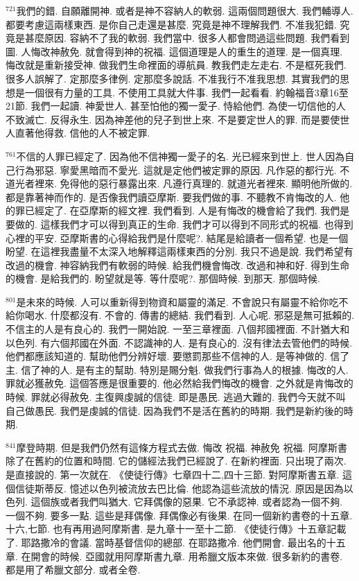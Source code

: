\documentclass{book}
\begin{document}
$^{721}$我們的錯.
自願離開神.
或者是神不容納人的軟弱.
這兩個問題很大.
我們輔導人.
都要考慮這兩樣東西.
是你自己走還是甚麼.
究竟是神不理解我們.
不准我犯錯.
究竟是甚麼原因.
容納不了我的軟弱.
我們當中.
很多人都會問過這些問題.
我們看到圖.
人悔改神赦免.
就會得到神的祝福.
這個道理是人的重生的道理.
是一個真理.
悔改就是重新接受神.
做我們生命裡面的導航員.
教我們走左走右.
不是框死我們.
很多人誤解了.
定那麼多律例.
定那麼多說話.
不准我行不准我思想.
其實我們的思想是一個很有力量的工具.
不使用工具就大件事.
我們一起看看.
約翰福音3章16至21節.
我們一起讀.
神愛世人.
甚至怕他的獨一愛子.
恃給他們.
為使一切信他的人不致滅亡.
反得永生.
因為神差他的兒子到世上來.
不是要定世人的罪.
而是要使世人直著他得救.
信他的人不被定罪.

$^{761}$不信的人罪已經定了.
因為他不信神獨一愛子的名.
光已經來到世上.
世人因為自己行為邪惡.
寧愛黑暗而不愛光.
這就是定他們被定罪的原因.
凡作惡的都行光.
不道光者裡來.
免得他的惡行暴露出來.
凡遵行真理的.
就道光者裡來.
顯明他所做的.
都是靠著神而作的.
是否像我們讀亞摩斯.
要我們做的事.
不聽教不肯悔改的人.
他的罪已經定了.
在亞摩斯的經文裡.
我們看到.
人是有悔改的機會給了我們.
我們是要做的.
這樣我們才可以得到真正的生命.
我們才可以得到不同形式的祝福.
也得到心裡的平安.
亞摩斯書的心得給我們是什麼呢?.
結尾是給讀者一個希望.
也是一個盼望.
在這裡我盡量不太深入地解釋這兩樣東西的分別.
我只不過是說.
我們希望有改過的機會.
神容納我們有軟弱的時候.
給我們機會悔改.
改過和神和好.
得到生命的機會.
是給我們的.
盼望就是等.
等什麼呢?.
那個時候.
到那天.
那個時候.

$^{801}$是未來的時候.
人可以重新得到物資和屬靈的滿足.
不會說只有屬靈不給你吃不給你喝水.
什麼都沒有.
不會的.
傳書的總結.
我們看到.
人心呢.
邪惡是無可抵賴的.
不信主的人是有良心的.
我們一開始說.
一至三章裡面.
八個邦國裡面.
不計猶大和以色列.
有六個邦國在外面.
不認識神的人.
是有良心的.
沒有律法去管他們的時候.
他們都應該知道的.
幫助他們分辨好壞.
要懲罰那些不信神的人.
是等神做的.
信了主.
信了神的人.
是有主的幫助.
特別是賜分魁.
做我們行事為人的根據.
悔改的人.
罪就必獲赦免.
這個答應是很重要的.
他必然給我們悔改的機會.
之外就是肯悔改的時候.
罪就必得赦免.
主復興虔誠的信徒.
即是愚民.
逃過大難的.
我們今天就不叫自己做愚民.
我們是虔誠的信徒.
因為我們不是活在舊約的時期.
我們是新約後的時期.

$^{841}$摩登時期.
但是我們仍然有這條方程式去做.
悔改 祝福.
神赦免 祝福.
阿摩斯書除了在舊約的位置和時間.
它的儲經法我們已經說了.
在新約裡面.
只出現了兩次.
是直接說的.
第一次就在.
《使徒行傳》七章四十二,四十三節.
對阿摩斯書五章.
這個信徒斯蒂反.
憶述以色列被流放去巴比倫.
他認為這些流放的情況.
原因是因為以色列.
這個族或者我們叫猶大.
它拜偶像的惡果.
它不承認神.
或者認為一個不夠.
一個不夠.
要多一點.
這些是拜偶像.
拜偶像必有後果.
在同一個新約書卷的十五章.
十六,七節.
也有再用過阿摩斯書.
是九章十一至十二節.
《使徒行傳》十五章記載了.
耶路撒冷的會議.
當時基督信仰的總部.
在耶路撒冷.
他們開會.
最出名的十五章.
在開會的時候.
亞國就用阿摩斯書九章.
用希臘文版本來做.
很多新約的書卷.
都是用了希臘文部分.
或者全卷.
\end{document}
